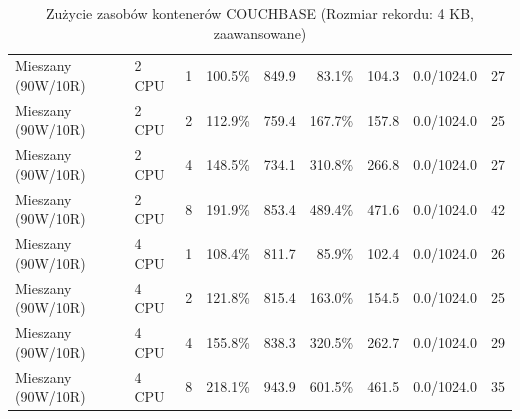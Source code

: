 \begin{table}[ht]
{\begin{tabular}{llcrrrrcc}
Mieszany (90W/10R) & 2 CPU & 1 & 100.5\% & 849.9 & 83.1\% & 104.3 & 0.0/1024.0 & 27 \\
Mieszany (90W/10R) & 2 CPU & 2 & 112.9\% & 759.4 & 167.7\% & 157.8 & 0.0/1024.0 & 25 \\
Mieszany (90W/10R) & 2 CPU & 4 & 148.5\% & 734.1 & 310.8\% & 266.8 & 0.0/1024.0 & 27 \\
Mieszany (90W/10R) & 2 CPU & 8 & 191.9\% & 853.4 & 489.4\% & 471.6 & 0.0/1024.0 & 42 \\
Mieszany (90W/10R) & 4 CPU & 1 & 108.4\% & 811.7 & 85.9\% & 102.4 & 0.0/1024.0 & 26 \\
Mieszany (90W/10R) & 4 CPU & 2 & 121.8\% & 815.4 & 163.0\% & 154.5 & 0.0/1024.0 & 25 \\
Mieszany (90W/10R) & 4 CPU & 4 & 155.8\% & 838.3 & 320.5\% & 262.7 & 0.0/1024.0 & 29 \\
Mieszany (90W/10R) & 4 CPU & 8 & 218.1\% & 943.9 & 601.5\% & 461.5 & 0.0/1024.0 & 35 \\
\bottomrule
\end{tabular}%
}
\caption{Zużycie zasobów kontenerów COUCHBASE (Rozmiar rekordu: 4 KB, zaawansowane)}
\label{tab:resources_couchbase_medium_0}
\end{table}
